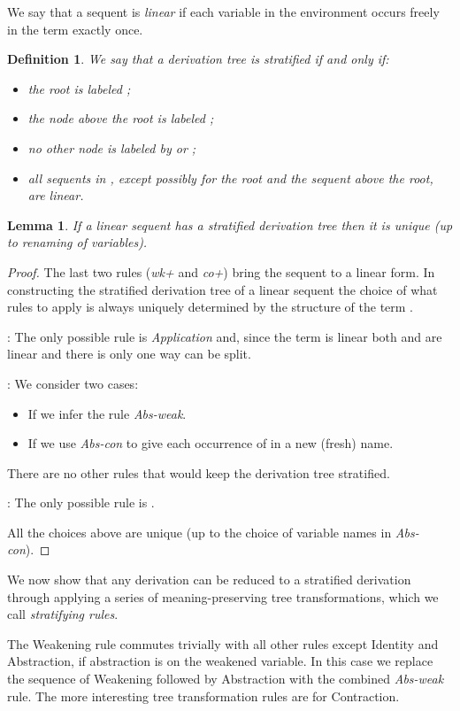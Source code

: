 \documentclass{article}
\newtheorem{definition}[theorem]{Definition}
\newtheorem{lemma}[theorem]{Lemma}
\begin{document}
We say that a sequent is \emph{linear} if each variable in the environment  occurs freely in the term  exactly once. 
\begin{definition}
We say that a  derivation tree  is \emph{stratified} if and only if:
\begin{itemize}
\item the root is labeled ;
\item the node above the root is labeled ;
\item no other node is labeled by  or ;
\item all sequents in , except possibly for the root and the sequent above the root, are linear. 
\end{itemize}
\end{definition}
\begin{lemma}\label{lem:struni}
If a linear sequent has a stratified derivation tree then it is unique (up to renaming of variables). 
\end{lemma}
\begin{proof}
The last two rules (\emph{wk+} and \emph{co+}) bring the sequent to a linear form. 
In constructing the stratified derivation tree  of a linear sequent  the choice of what rules to apply is always uniquely determined by the structure of the term . 
\begin{description}
\item{:} The only possible rule is \emph{Application} and, since the term  is linear both  and  are linear and there is only one way  can be split. 
\item{:} We consider two cases:
\begin{itemize}
\item If  we infer the rule \emph{Abs-weak}. 
\item If  we use \emph{Abs-con} to give each occurrence of  in  a new (fresh) name.  
\end{itemize}
There are no other rules that would keep the derivation tree stratified. 
\item{:} The only possible rule is . 
\end{description}
All the choices above are unique (up to the choice of variable names in \emph{Abs-con}).
\end{proof}
We now show that any  derivation can be reduced to a stratified derivation through applying a series of meaning-preserving tree transformations, which we call \emph{stratifying rules}.

The Weakening rule commutes trivially with all other rules except Identity and Abstraction, if abstraction is on the weakened variable. In this case we replace the sequence of Weakening followed by Abstraction with the combined \emph{Abs-weak} rule.
The more interesting tree transformation rules are for Contraction. 
\end{document}
